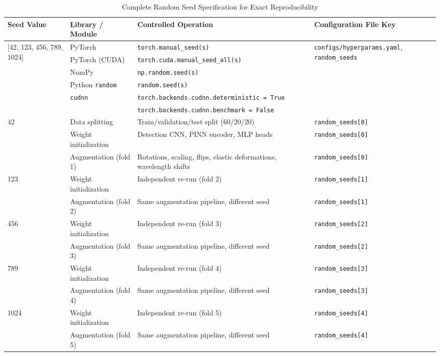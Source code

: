 \documentclass[usenatbib]{mnras}
\begin{document}
\begin{table}[htbp]
\centering
\caption{Complete Random Seed Specification for Exact Reproducibility}\label{tab:seeds}
\begin{tabular}{lllp{5.5cm}}
\toprule
Seed Value & Library / Module & Controlled Operation & Configuration File Key \\
\midrule
\multirow{5}{*}{[42, 123, 456, 789, 1024]} & PyTorch & \texttt{torch.manual\_seed(s)} & \multirow{5}{*}{\texttt{configs/hyperparams.yaml}, \texttt{random\_seeds}} \\
 & PyTorch (CUDA) & \texttt{torch.cuda.manual\_seed\_all(s)} & \\
 & NumPy & \texttt{np.random.seed(s)} & \\
 & Python \texttt{random} & \texttt{random.seed(s)} & \\
 & \texttt{cudnn} & \texttt{torch.backends.cudnn.deterministic = True} & \\
 & & \texttt{torch.backends.cudnn.benchmark = False} & \\
\midrule
\multirow{3}{*}{42} & Data splitting & Train/validation/test split (60/20/20) & \texttt{random\_seeds[0]} \\
 & Weight initialization & Detection CNN, PINN encoder, MLP heads & \texttt{random\_seeds[0]} \\
 & Augmentation (fold 1) & Rotations, scaling, flips, elastic deformations, wavelength shifts & \texttt{random\_seeds[0]} \\
\midrule
\multirow{2}{*}{123} & Weight initialization & Independent re-run (fold 2) & \texttt{random\_seeds[1]} \\
 & Augmentation (fold 2) & Same augmentation pipeline, different seed & \texttt{random\_seeds[1]} \\
\midrule
\multirow{2}{*}{456} & Weight initialization & Independent re-run (fold 3) & \texttt{random\_seeds[2]} \\
 & Augmentation (fold 3) & Same augmentation pipeline, different seed & \texttt{random\_seeds[2]} \\
\midrule
\multirow{2}{*}{789} & Weight initialization & Independent re-run (fold 4) & \texttt{random\_seeds[3]} \\
 & Augmentation (fold 4) & Same augmentation pipeline, different seed & \texttt{random\_seeds[3]} \\
\midrule
\multirow{2}{*}{1024} & Weight initialization & Independent re-run (fold 5) & \texttt{random\_seeds[4]} \\
 & Augmentation (fold 5) & Same augmentation pipeline, different seed & \texttt{random\_seeds[4]} \\

\end{tabular}
\end{table}
\end{document}
